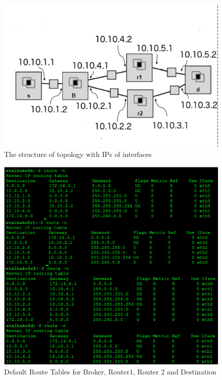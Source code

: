 \begin{figure}[ht]
   \centering
   \includegraphics[scale=.40]{images/IPs.png}
    \caption{The structure of topology with IPs of interfaces}
    \label{fig:topology}
\end{figure}
\begin{figure}[ht]
   \centering
   \includegraphics[scale=.40]{images/VM_default.png}
    \caption{Default Route Tables for Broker, Router1, Router 2 and Destination}
    \label{fig:topology}
\end{figure}
\newpage

